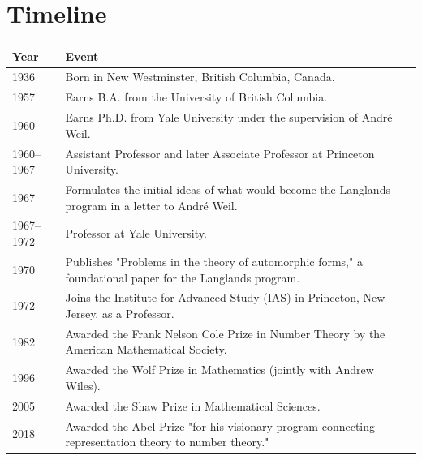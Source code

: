 \section*{Timeline}
\begin{tabularx}{\linewidth}{|p{1.5cm}|>{\raggedright\arraybackslash}X|}
\hline
\textbf{Year} & \textbf{Event} \\ \hline
1936 & Born in New Westminster, British Columbia, Canada. \\ \hline
1957 & Earns B.A. from the University of British Columbia. \\ \hline
1960 & Earns Ph.D. from Yale University under the supervision of André Weil. \\ \hline
1960--1967 & Assistant Professor and later Associate Professor at Princeton University. \\ \hline
1967 & Formulates the initial ideas of what would become the Langlands program in a letter to André Weil. \\ \hline
1967--1972 & Professor at Yale University. \\ \hline
1970 & Publishes "Problems in the theory of automorphic forms," a foundational paper for the Langlands program. \\ \hline
1972 & Joins the Institute for Advanced Study (IAS) in Princeton, New Jersey, as a Professor. \\ \hline
1982 & Awarded the Frank Nelson Cole Prize in Number Theory by the American Mathematical Society. \\ \hline
1996 & Awarded the Wolf Prize in Mathematics (jointly with Andrew Wiles). \\ \hline
2005 & Awarded the Shaw Prize in Mathematical Sciences. \\ \hline
2018 & Awarded the Abel Prize "for his visionary program connecting representation theory to number theory." \\ \hline
\end{tabularx}

